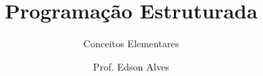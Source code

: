 \title{Programação Estruturada}
\subtitle{Conceitos Elementares}
\date{}
\author{Prof. Edson Alves}
